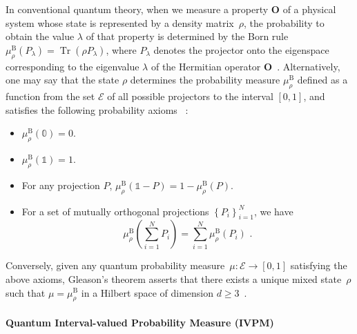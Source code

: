 \documentclass[english,reprint, aps, prl,superscriptaddress, showpacs,
showkeys]{revtex4-1}
\theoremstyle{plain}
\theoremstyle{definition}
\newcommand{\events}{\ensuremath{\mathcal{E}}}
\newcommand{\Tr}{\mathop{\mathrm{Tr}}\nolimits}
\begin{document}
In conventional quantum theory, when we measure a property $\mathbf{O}$
of a physical system whose state is represented by a density matrix~$\rho$,
the probability to obtain the value $\lambda$ of that property is determined by the
Born rule $\mu_{\rho}^{\mathrm{\mathrm{B}}}\left(P_{\lambda}\right)=\Tr\left(\rho P_{\lambda}\right)$,
where $P_{\lambda}$ denotes the projector onto the eigenspace corresponding
to the eigenvalue $\lambda$ of the Hermitian operator
$\mathbf{O}$~\citep{Born1983,peres1995quantum,544199,Jaeger2007}. 
Alternatively, one may say that the state $\rho$ determines the 
probability measure $\mu_{\rho}^{\mathrm{\mathrm{B}}}$ defined as a
function from the set $\events$ of all possible projectors to the interval 
$[0,1]$, and satisfies the following probability axioms~
\citep{10.2307/2308516,gleason1957,Redhead1987-REDINA,Maassen2010}: 
\begin{itemize}
\item $\mu_{\rho}^{\mathrm{\mathrm{B}}}(\mathbb{0})=0$. 
\item $\mu_{\rho}^{\mathrm{\mathrm{B}}}(\mathbb{1})=1$. 
\item For any projection $P$, $\mu_{\rho}^{\mathrm{\mathrm{B}}}\left(\mathbb{1}-P\right)=1-\mu_{\rho}^{\mathrm{\mathrm{B}}}\left(P\right)$. 
\item For a set of mutually orthogonal projections $\left\{ P_{i}\right\} _{i=1}^{N}$,
we have 
\begin{equation}
\mu_{\rho}^{\mathrm{\mathrm{B}}}\left(\sum_{i=1}^{N}P_{i}\right)=\sum_{i=1}^{N}\mu_{\rho}^{\mathrm{\mathrm{B}}}\left(P_{i}\right)\textrm{ .}\label{eq:QuantumProbability-Addition}
\end{equation}
\end{itemize}
Conversely, given any quantum probability measure~$\mu:\events\rightarrow[0,1]$
satisfying the above axioms, Gleason's theorem asserts that there
exists a unique mixed state~$\rho$ such that $\mu=\mu_{\rho}^{\mathrm{\mathrm{B}}}$
in a Hilbert space of dimension $d\geq3$~\citep{gleason1957,Redhead1987-REDINA,peres1995quantum}.

\paragraph{Quantum Interval-valued Probability Measure (IVPM)}
\end{document}
